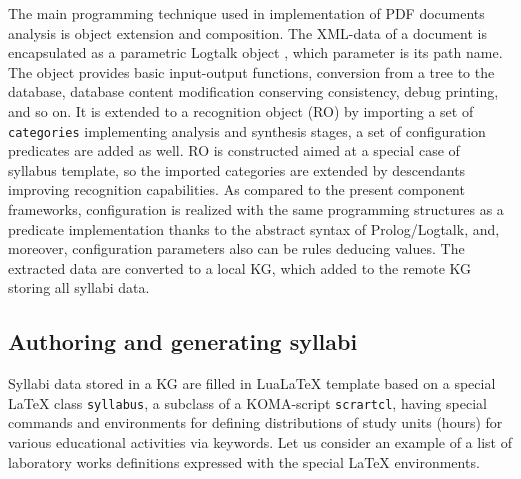 \documentclass[
]{ceurart}
\providecommand{\LuaLaTeX}{Lua\LaTeX}
\begin{document}
The main programming technique used in implementation of PDF documents analysis is object extension and composition.  The XML-data of a document is encapsulated as a parametric Logtalk object \cite{logtalk}, which parameter is its path name.  The object provides basic input-output functions, conversion from a tree to the database, database content modification conserving consistency, debug printing, and so on.  It is extended to a recognition object (RO) by importing a set of \verb|categories| implementing analysis and synthesis stages, a set of configuration predicates are added as well.  RO is constructed aimed at a special case of syllabus template, so the imported categories are extended by descendants improving recognition capabilities.  As compared to the present component frameworks, configuration is realized with the same programming structures as a predicate implementation thanks to the abstract syntax of Prolog/Logtalk, and, moreover, configuration parameters also can be rules deducing values.  The extracted data are converted to a local KG, which added to the remote KG storing all syllabi data.

\subsection{Authoring and generating syllabi}

Syllabi data stored in a KG are filled in \LuaLaTeX{} template based on a special \LaTeX{} class \verb|syllabus|, a subclass of a KOMA-script \verb|scrartcl|, having special commands and environments for defining distributions of study units (hours) for various educational activities via keywords.  Let us consider an example of a list of laboratory works definitions expressed with the special \LaTeX{} environments.
\end{document}
